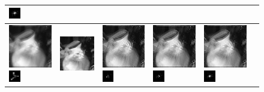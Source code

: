 \begin{figure}
\begin{tabular}{|l|l|l|l|l|l|}
\includegraphics[width=0.5cm]{results/louxor_kernel1_MAPkreg_k.png}
\\ 
 \hline\includegraphics[width=2.5cm]{results/louxor_kernel2_blurred.png}
\includegraphics[width=0.5cm]{images/kernel2}
& \includegraphics[width=2.5cm]{results/louxor_kernel2_nonblind_deconv.png}
&\includegraphics[width=2.5cm]{results/louxor_kernel2_MAPxk_x.png}
\includegraphics[width=0.5cm]{results/louxor_kernel2_MAPxk_k.png}
&\includegraphics[width=2.5cm]{results/louxor_kernel2_MAPk_x.png}
\includegraphics[width=0.5cm]{results/louxor_kernel2_MAPk_k.png}
&\includegraphics[width=2.5cm]{results/louxor_kernel2_MAPkreg_x.png}
\includegraphics[width=0.5cm]{results/louxor_kernel2_MAPkreg_k.png}

\end{tabular}
\end{figure}
